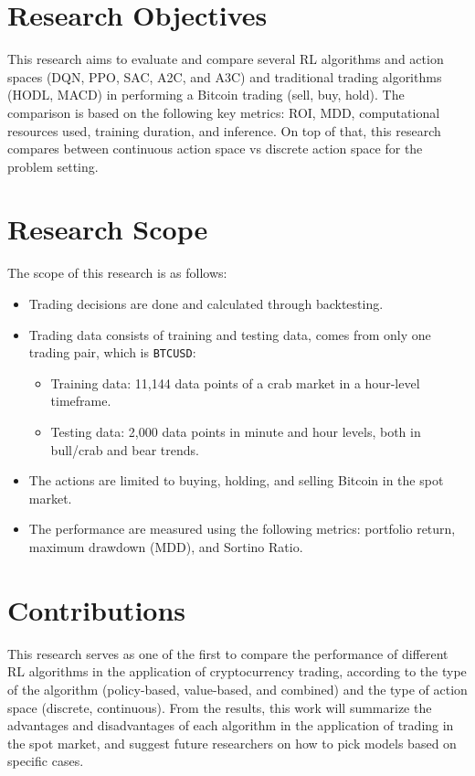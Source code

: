 \section{Research Objectives}
This research aims to evaluate and compare several RL algorithms and action spaces (DQN, PPO, SAC, A2C, and A3C) and traditional trading algorithms (HODL, MACD) in performing a Bitcoin trading (sell, buy, hold). The comparison is based on the following key metrics: ROI, MDD, computational resources used, training duration, and inference. On top of that, this research compares between continuous action space vs discrete action space for the problem setting.


\section{Research Scope}
The scope of this research is as follows:
\begin{itemize}
	\item Trading decisions are done and calculated through backtesting.
	\item Trading data consists of training and testing data, comes from only one trading pair, which is \texttt{BTCUSD}:
	\begin{itemize}
		\item Training data: 11,144 data points of a crab market in a hour-level timeframe.
		\item Testing data: 2,000 data points in minute and hour levels, both in bull/crab and bear trends.
	\end{itemize}
	\item The actions are limited to buying, holding, and selling Bitcoin in the spot market.
	\item The performance are measured using the following metrics: portfolio return, maximum drawdown (MDD), and Sortino Ratio.
\end{itemize}

\section{Contributions}
This research serves as one of the first to compare the performance of different RL algorithms in the application of cryptocurrency trading, according to the type of the algorithm (policy-based, value-based, and combined) and the type of action space (discrete, continuous). From the results, this work will summarize the advantages and disadvantages of each algorithm in the application of trading in the spot market, and suggest future researchers on how to pick models based on specific cases.
